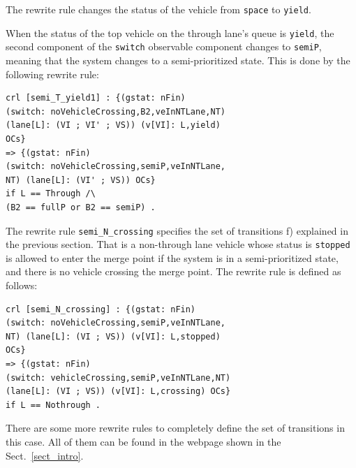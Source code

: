\documentclass[10pt, conference, compsocconf]{IEEEtran}
\begin{document}
\noindent
The rewrite rule changes
the status of the vehicle from \verb!space! to \verb!yield!.

When the status of the top vehicle on the through lane's queue is \verb!yield!, the second component of the \verb!switch! observable component changes to \verb!semiP!, meaning that the system changes to a semi-prioritized state.
This is done by the following rewrite rule:

\begin{small}
\begin{verbatim}
crl [semi_T_yield1] : {(gstat: nFin) 
(switch: noVehicleCrossing,B2,veInNTLane,NT) 
(lane[L]: (VI ; VI' ; VS)) (v[VI]: L,yield) 
OCs} 
=> {(gstat: nFin) 
(switch: noVehicleCrossing,semiP,veInNTLane,
NT) (lane[L]: (VI' ; VS)) OCs} 
if L == Through /\ 
(B2 == fullP or B2 == semiP) .
\end{verbatim}
\end{small}

The rewrite rule \verb!semi_N_crossing! specifies the set of transitions f) explained in the previous section.
That is a non-through lane vehicle whose status is \verb!stopped! is allowed to enter the merge point
if the system is in a semi-prioritized state, and there is no vehicle crossing the merge point. 
The rewrite rule is defined as follows:

\begin{small}
\begin{verbatim}
crl [semi_N_crossing] : {(gstat: nFin) 
(switch: noVehicleCrossing,semiP,veInNTLane,
NT) (lane[L]: (VI ; VS)) (v[VI]: L,stopped) 
OCs} 
=> {(gstat: nFin) 
(switch: vehicleCrossing,semiP,veInNTLane,NT) 
(lane[L]: (VI ; VS)) (v[VI]: L,crossing) OCs}
if L == Nothrough .
\end{verbatim}
\end{small}

There are some more rewrite rules to completely define the set of transitions in this case.
All of them can be found in the webpage shown in the Sect.~\ref{sect_intro}.
\end{document}
